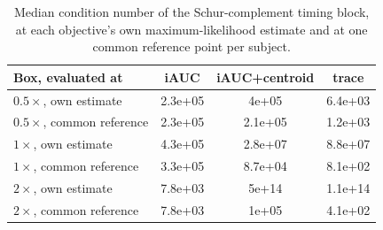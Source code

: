 \begin{table}[t]
\centering\small
\begin{tabular}{lccc}
\toprule
Box, evaluated at & iAUC & iAUC+centroid & trace \\
\midrule
$0.5\times$, own estimate & 2.3e+05 & 4e+05 & 6.4e+03 \\
$0.5\times$, common reference & 2.3e+05 & 2.1e+05 & 1.2e+03 \\
$1\times$, own estimate & 4.3e+05 & 2.8e+07 & 8.8e+07 \\
$1\times$, common reference & 3.3e+05 & 8.7e+04 & 8.1e+02 \\
$2\times$, own estimate & 7.8e+03 & 5e+14 & 1.1e+14 \\
$2\times$, common reference & 7.8e+03 & 1e+05 & 4.1e+02 \\
\bottomrule
\end{tabular}
\caption{Median condition number of the Schur-complement timing block, at each objective's own maximum-likelihood estimate and at one common reference point per subject.}
\label{tab:ladder}
\end{table}
